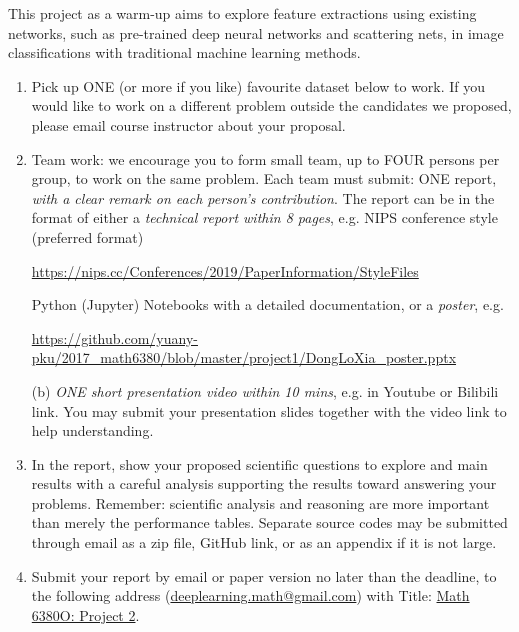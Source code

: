 \documentclass[11pt]{article}
\begin{document}
This project as a warm-up aims to explore feature extractions using existing networks, such as pre-trained deep neural networks and scattering nets, in image classifications with traditional machine learning methods.
\begin{enumerate}
\item Pick up ONE (or more if you like) favourite dataset below to work. If you would like to work on a different problem outside the candidates we proposed, please email course instructor about your proposal.  
\item Team work: we encourage you to form small team, up to FOUR persons per group, to work on the same problem. Each team must submit:
\subitem ONE report, \emph{with a clear remark on each person's contribution}. The report can be in the format of either a \emph{technical report within 8 pages}, e.g. NIPS conference style (preferred format) 
\begin{center}
\url{https://nips.cc/Conferences/2019/PaperInformation/StyleFiles} 
\end{center}
Python (Jupyter) Notebooks with a detailed documentation, or a \emph{poster}, e.g. 
\begin{center}%
\url{https://github.com/yuany-pku/2017_math6380/blob/master/project1/DongLoXia_poster.pptx}
\end{center}
\subitem(b) \emph{ONE short presentation video within 10 mins}, e.g. in Youtube or Bilibili link. You may submit your presentation slides together with the video link to help understanding. 
\item In the report, show your proposed scientific questions to explore and main results with a careful analysis supporting the results toward answering your problems. Remember: scientific analysis and reasoning are more important than merely the performance tables. Separate source codes may be submitted through email as a zip file, GitHub link, or as an appendix if it is not large.    
\item Submit your report by email or paper version no later than the deadline, to the following address (\href{mailto:deeplearning.math@gmail.com}{deeplearning.math@gmail.com}) with Title: \underline{Math 6380O: Project 2}. %
\end{enumerate}
\end{document}
